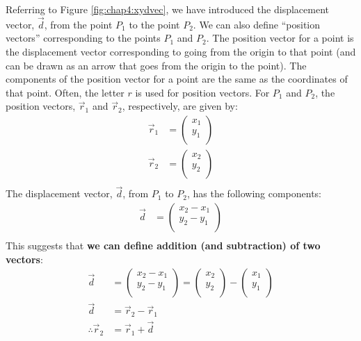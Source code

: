 Referring to Figure \ref{fig:chap4:xydvec}, we have introduced the displacement vector, $\vec d$, from the point $P_1$ to the point $P_2$. We can also define ``position vectors'' corresponding to the points $P_1$ and $P_2$. The position vector for a point is the displacement vector corresponding to going from the origin to that point (and can be drawn as an arrow that goes from the origin to the point). The components of the position vector for a point are the same as the coordinates of that point. Often, the letter $r$ is used for position vectors. For $P_1$ and $P_2$, the position vectors, $\vec r_1$ and $\vec r_2$, respectively, are given by:
\begin{align*}
\vec r_1&=\begin{pmatrix}
           x_1 \\
           y_1 \\
         \end{pmatrix}\\
\vec r_2&=\begin{pmatrix}
           x_2 \\
           y_2 \\
         \end{pmatrix}\\
\end{align*}
The displacement vector, $\vec d$, from $P_1$ to $P_2$, has the following components:
\begin{align*}
\vec{d}&=\begin{pmatrix}
           x_2-x_1 \\
           y_2-y_1 \\
         \end{pmatrix}\\
\end{align*}
This suggests that \textbf{we can define addition (and subtraction) of two vectors}:
\begin{align*}
\vec{d}&=\begin{pmatrix}
           x_2-x_1 \\
           y_2-y_1 \\
         \end{pmatrix}=\begin{pmatrix}
           x_2 \\
           y_2 \\
         \end{pmatrix}-\begin{pmatrix}
           x_1 \\
           y_1 \\
         \end{pmatrix}\\
         \vec d&=\vec r_2-\vec r_1\\
         \therefore \vec r_2&=\vec r_1+\vec d
\end{align*}
